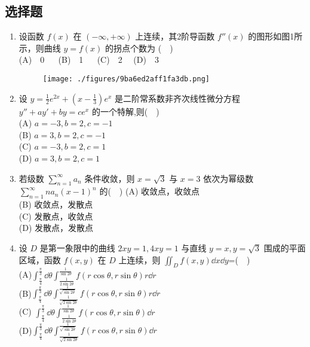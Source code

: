 \subsection{选择题}
\begin{enumerate}($\quad$)
\item 设函数 $f(x)$ 在 $(-\infty,+\infty)$ 上连续，其2阶导函数 $f''(x)$  的图形如图1所示，则曲线 $y=f(x)$ 的拐点个数为 ($\quad$)\\
(A)$\quad$0  $\quad$  (B)$\quad$1 $\quad$  (C)$\quad$2  $\quad$(D)$\quad$3 
\begin{figure}[ht]
\centering
\texttt{[image: ./figures/9ba6ed2aff1fa3db.png]}
\caption{} \label{fig_PeeM15_1}
\end{figure}
\item 设 $y=\frac{1}{2}e^{2x}+(x-\frac{1}{3})e^x$ 是二阶常系数非齐次线性微分方程 $y''+ay'+by=ce^x$  的一个特解,则($\quad$)\\
(A) $a=-3,b=2,c=-1$\\
(B) $a=3,b=2,c=-1$\\
(C) $a=-3,b=2,c=1$\\
(D) $a=3,b=2,c=1$
\item 若级数 $\displaystyle \sum_{n=1}^\infty a_n $ 条件收敛，则 $x=\sqrt{3}$ 与 $x=3$  依次为幂级数 $\displaystyle \sum_{n=1}^\infty na_n(x-1)^n$  的($\quad$)
(A) 收敛点，收敛点\\
(B) 收敛点，发散点\\
(C) 发散点，收敛点\\
(D) 发散点，发散点
\item  设 $D$ 是第一象限中的曲线 $2xy=1,4xy=1$   与直线 $y=x,y=\sqrt{3}$  围成的平面区域，函数 $f(x,y)$   在 $D$ 上连续，则 $\displaystyle {\iint}_D f(x,y)\dd{x}\dd{y}$=($\quad$)\\
(A)$\displaystyle  \int_\frac{\pi}{4}^\frac{\pi}{3}\dd{\theta}\int_\frac{1}{2\sin 2\theta}^\frac{1}{\sin 2\theta}f(r\cos \theta,r\sin \theta)r\dd{r}$\\
(B)$\displaystyle  \int_\frac{\pi}{4}^\frac{\pi}{3}\dd{\theta}\int_\frac{1}{\sqrt{2\sin 2\theta}}^\frac{1}{\sqrt{\sin 2\theta}}f(r\cos \theta,r\sin \theta)r\dd{r}$\\
(C) $\displaystyle  \int_\frac{\pi}{4}^\frac{\pi}{3}\dd{\theta}\int_\frac{1}{2\sin 2\theta}^\frac{1}{\sin 2\theta}f(r\cos \theta,r\sin \theta)\dd{r}$\\
(D)$\displaystyle  \int_\frac{\pi}{4}^\frac{\pi}{3}\dd{\theta}\int_\frac{1}{\sqrt{2\sin 2\theta}}^\frac{1}{\sqrt{\sin 2\theta}}f(r\cos \theta,r\sin \theta)\dd{r}$

\end{enumerate}

